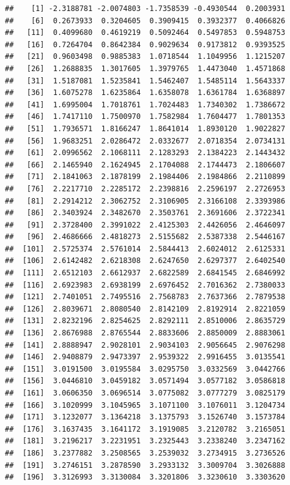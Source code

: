 \documentclass[
  11pt]{report}
\begin{document}
\begin{itemize}
\begin{verbatim}
##    [1] -2.3188781 -2.0074803 -1.7358539 -0.4930544  0.2003931
##    [6]  0.2673933  0.3204605  0.3909415  0.3932377  0.4066826
##   [11]  0.4099680  0.4619219  0.5092464  0.5497853  0.5948753
##   [16]  0.7264704  0.8642384  0.9029634  0.9173812  0.9393525
##   [21]  0.9603498  0.9885383  1.0718544  1.1049956  1.1215207
##   [26]  1.2688835  1.3017605  1.3979765  1.4473040  1.4571868
##   [31]  1.5187081  1.5235841  1.5462407  1.5485114  1.5643337
##   [36]  1.6075278  1.6235864  1.6358078  1.6361784  1.6368897
##   [41]  1.6995004  1.7018761  1.7024483  1.7340302  1.7386672
##   [46]  1.7417110  1.7500970  1.7582984  1.7604477  1.7801353
##   [51]  1.7936571  1.8166247  1.8641014  1.8930120  1.9022827
##   [56]  1.9683251  2.0286472  2.0332677  2.0718354  2.0734131
##   [61]  2.0996562  2.1068111  2.1283293  2.1384223  2.1443432
##   [66]  2.1465940  2.1624945  2.1704088  2.1744473  2.1806607
##   [71]  2.1841063  2.1878199  2.1984406  2.1984866  2.2110899
##   [76]  2.2217710  2.2285172  2.2398816  2.2596197  2.2726953
##   [81]  2.2914212  2.3062752  2.3106905  2.3166108  2.3393986
##   [86]  2.3403924  2.3482670  2.3503761  2.3691606  2.3722341
##   [91]  2.3728400  2.3991022  2.4125303  2.4426056  2.4646097
##   [96]  2.4686666  2.4818273  2.5155682  2.5387338  2.5446167
##  [101]  2.5725374  2.5761014  2.5844413  2.6024012  2.6125331
##  [106]  2.6142482  2.6218308  2.6247650  2.6297377  2.6402540
##  [111]  2.6512103  2.6612937  2.6822589  2.6841545  2.6846992
##  [116]  2.6923983  2.6938199  2.6976452  2.7016362  2.7380033
##  [121]  2.7401051  2.7495516  2.7568783  2.7637366  2.7879538
##  [126]  2.8039671  2.8080540  2.8142109  2.8192914  2.8221059
##  [131]  2.8232196  2.8254625  2.8292111  2.8510006  2.8635729
##  [136]  2.8676988  2.8765544  2.8833606  2.8850009  2.8883061
##  [141]  2.8888947  2.9028101  2.9034103  2.9056645  2.9076298
##  [146]  2.9408879  2.9473397  2.9539322  2.9916455  3.0135541
##  [151]  3.0191500  3.0195584  3.0295750  3.0332569  3.0442766
##  [156]  3.0446810  3.0459182  3.0571494  3.0577182  3.0586818
##  [161]  3.0606350  3.0696514  3.0775082  3.0777279  3.0825179
##  [166]  3.1020999  3.1045965  3.1071100  3.1076011  3.1204734
##  [171]  3.1232077  3.1364218  3.1375793  3.1526740  3.1573784
##  [176]  3.1637435  3.1641172  3.1919085  3.2120782  3.2165051
##  [181]  3.2196217  3.2231951  3.2325443  3.2338240  3.2347162
##  [186]  3.2377882  3.2508565  3.2539032  3.2734915  3.2736526
##  [191]  3.2746151  3.2878590  3.2933132  3.3009704  3.3026888
##  [196]  3.3126993  3.3130084  3.3201806  3.3230610  3.3303620

\end{verbatim}
\end{itemize}
\end{document}
